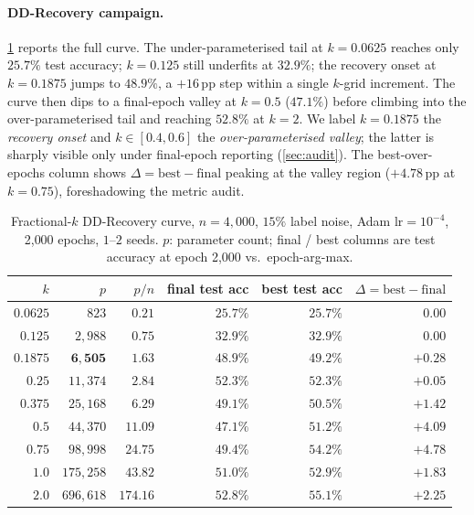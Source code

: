 \documentclass{article}
\begin{document}
\paragraph{DD-Recovery campaign.} \cref{tab:dd-recovery} reports the full curve. The under-parameterised tail at $k\!=\!0.0625$ reaches only $25.7\%$ test accuracy; $k\!=\!0.125$ still underfits at $32.9\%$; the recovery onset at $k\!=\!0.1875$ jumps to $48.9\%$, a $+16$\,pp step within a single $k$-grid increment. The curve then dips to a final-epoch valley at $k\!=\!0.5$ ($47.1\%$) before climbing into the over-parameterised tail and reaching $52.8\%$ at $k\!=\!2$. We label $k\!=\!0.1875$ the \emph{recovery onset} and $k\!\in\![0.4,0.6]$ the \emph{over-parameterised valley}; the latter is sharply visible only under final-epoch reporting (\cref{sec:audit}). The best-over-epochs column shows $\Delta\!=\!\mathrm{best}\!-\!\mathrm{final}$ peaking at the valley region ($+4.78$\,pp at $k\!=\!0.75$), foreshadowing the metric audit.

\begin{table}[t]
  \centering
  \small
  \caption{Fractional-$k$ DD-Recovery curve, $n\!=\!4{,}000$, $15\%$ label noise, Adam $\mathrm{lr}\!=\!10^{-4}$, 2{,}000 epochs, $1$--$2$ seeds. $p$: parameter count; final / best columns are test accuracy at epoch 2{,}000 vs.\ epoch-arg-max.}
  \label{tab:dd-recovery}
  \begin{tabular}{rrrrrr}
    \toprule
    $k$ & $p$ & $p/n$ & final test acc & best test acc & $\Delta = \mathrm{best}-\mathrm{final}$ \\
    \midrule
    $0.0625$ & $823$    & $0.21$  & $25.7\%$ & $25.7\%$ & $\phantom{+}0.00$ \\
    $0.125$  & $2{,}988$ & $0.75$ & $32.9\%$ & $32.9\%$ & $\phantom{+}0.00$ \\
    \textbf{$0.1875$} & $\mathbf{6{,}505}$ & $\mathbf{1.63}$ & $\mathbf{48.9\%}$ & $\mathbf{49.2\%}$ & $+0.28$ \\
    $0.25$   & $11{,}374$ & $2.84$  & $52.3\%$ & $52.3\%$ & $+0.05$ \\
    $0.375$  & $25{,}168$ & $6.29$  & $49.1\%$ & $50.5\%$ & $+1.42$ \\
    $0.5$    & $44{,}370$ & $11.09$ & $47.1\%$ & $51.2\%$ & $+4.09$ \\
    $0.75$   & $98{,}998$ & $24.75$ & $49.4\%$ & $54.2\%$ & $+4.78$ \\
    $1.0$    & $175{,}258$ & $43.82$ & $51.0\%$ & $52.9\%$ & $+1.83$ \\
    $2.0$    & $696{,}618$ & $174.16$ & $52.8\%$ & $55.1\%$ & $+2.25$ \\
    \bottomrule
  \end{tabular}
\end{table}
\end{document}
